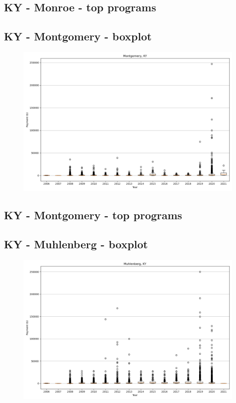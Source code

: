 \subsection*{KY - Monroe - top programs}

\newpage
\subsection*{KY - Montgomery - boxplot}
\begin{figure}[h]
\centering
\includegraphics[width=7in]{../output/boxplots/counties/Montgomery-KY_boxplot.png}
\end{figure}


\subsection*{KY - Montgomery - top programs}

\newpage
\subsection*{KY - Muhlenberg - boxplot}
\begin{figure}[h]
\centering
\includegraphics[width=7in]{../output/boxplots/counties/Muhlenberg-KY_boxplot.png}
\end{figure}


